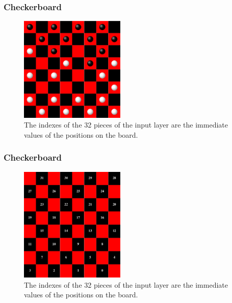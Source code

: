 \documentclass{beamer}
\begin{document}
\begin{frame}
	\frametitle{Checkerboard}
	\begin{figure}[ht!]
		\centering
		\includegraphics[width=50mm]{sampleGame.png}
		\caption{The indexes of the 32 pieces of the input layer are the immediate values of the positions on the board. \label{overflow}}
	\end{figure}
\end{frame}

\begin{frame}
	\frametitle{Checkerboard}
	\begin{figure}[ht!]
		\centering
		\includegraphics[width=50mm]{checkerboard.png}
		\caption{The indexes of the 32 pieces of the input layer are the immediate values of the positions on the board. \label{overflow}}
	\end{figure}
\end{frame}
\end{document}
